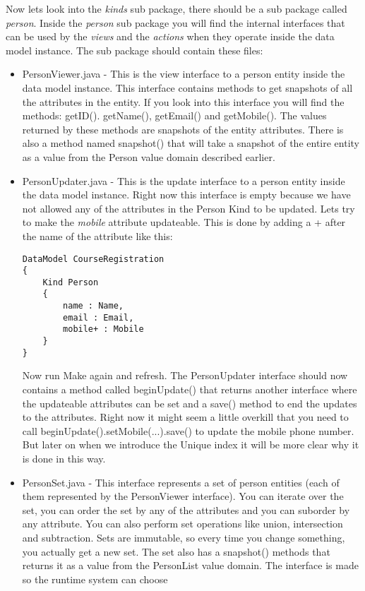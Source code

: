 Now lets look into the \emph{kinds} sub package, there should be a
sub package called \emph{person}. Inside the \emph{person} sub package
you will find the internal interfaces that can be used by the \emph{views}
and the \emph{actions} when they operate inside the data model instance.
The sub package should contain these files:
\begin{itemize}
\item PersonViewer.java - This is the view interface to a person entity
inside the data model instance. This interface contains methods to
get snapshots of all the attributes in the entity. If you look into
this interface you will find the methods: getID(). getName(), getEmail()
and getMobile(). The values returned by these methods are snapshots
of the entity attributes. There is also a method named snapshot()
that will take a snapshot of the entire entity as a value from the
Person value domain described earlier.
\item PersonUpdater.java - This is the update interface to a person entity
inside the data model instance. Right now this interface is empty
because we have not allowed any of the attributes in the Person Kind
to be updated. Lets try to make the \emph{mobile} attribute updateable.
This is done by adding a + after the name of the attribute like this:
\begin{lstlisting}[basicstyle={\scriptsize}]
DataModel CourseRegistration
{
	Kind Person
	{
		name : Name,
		email : Email,
		mobile+ : Mobile
	}
}
\end{lstlisting}
Now run Make again and refresh. The PersonUpdater interface should
now contains a method called beginUpdate() that returns another interface
where the updateable attributes can be set and a save() method to
end the updates to the attributes. Right now it might seem a little
overkill that you need to call beginUpdate().setMobile(...).save()
to update the mobile phone number. But later on when we introduce
the Unique index it will be more clear why it is done in this way.
\item PersonSet.java - This interface represents a set of person entities
(each of them represented by the PersonViewer interface). You can
iterate over the set, you can order the set by any of the attributes
and you can suborder by any attribute. You can also perform set operations
like union, intersection and subtraction. Sets are immutable, so every
time you change something, you actually get a new set. The set also
has a snapshot() methods that returns it as a value from the PersonList
value domain. The interface is made so the runtime system can choose

\end{itemize}
